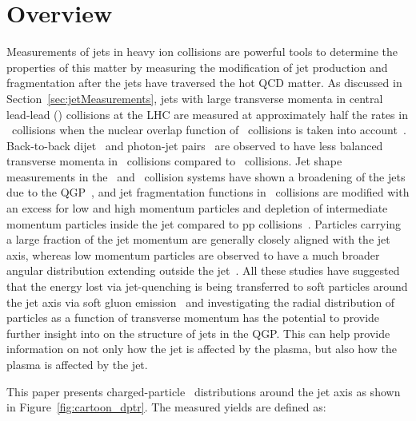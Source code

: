 
\section{Overview}

Measurements of jets in heavy ion collisions are powerful tools to determine the properties of this matter by measuring the modification of jet production and fragmentation after the jets have traversed the hot QCD matter.
As discussed in Section~\ref{sec:jetMeasurements}, jets with large transverse momenta in central lead-lead (\pbpb) collisions at the LHC are measured at approximately half the rates in \pp\ collisions when the nuclear overlap function of \pbpb\ collisions is taken into account~\cite{Abelev:2013kqa,Aad:2014bxa,Adam:2015ewa,Khachatryan:2016jfl, Khachatryan:2016odn, 2019108}.
Back-to-back dijet~\cite{Aad:2010bu,Chatrchyan:2011sx,Aaboud:2017eww} and photon-jet pairs~\cite{Chatrchyan:2012gt,2019167} are observed to have less balanced transverse momenta in \pbpb\ collisions compared to \pp\ collisions.
Jet shape measurements in the \pp\ and \pbpb\ collision systems have shown a broadening of the jets due to the QGP~\cite{Aad:2011sc, Acharya:2018uvf, Chatrchyan:2012mec, Chatrchyan:2013kwa}, and jet fragmentation functions in \pbpb\ collisions are modified with an excess for low and high momentum particles and depletion of intermediate momentum particles inside the jet compared to pp collisions~\cite{Aad:2014wha,Chatrchyan:2014ava,Aaboud:2017bzv,PhysRevC.98.024908}.
Particles carrying a large fraction of the jet momentum are generally closely aligned with the jet axis, whereas low momentum particles are observed to have a much broader angular distribution extending outside the jet~\cite{Chatrchyan:2011sx,Khachatryan2016,Khachatryan:2016tfj,Sirunyan:2018jqr}.
All these studies have suggested that the energy lost via jet-quenching is being transferred to soft particles around the jet axis via soft gluon emission~\cite{Vitev:2008rz,Ovanesyan:2011xy,Blaizot:2014ula,Qin:2015srf,Escobedo:2016jbm,Casalderrey-Solana:2016jvj,Tachibana:2017syd} and investigating the radial distribution of particles as a function of transverse momentum has the potential to provide further insight into on the structure of jets in the QGP.
This can help provide information on not only how the jet is affected by the plasma, but also how the plasma is affected by the jet. 

This paper presents charged-particle \pt\ distributions around the jet axis as shown in Figure~\ref{fig:cartoon_dptr}. 
The measured yields are defined as:


